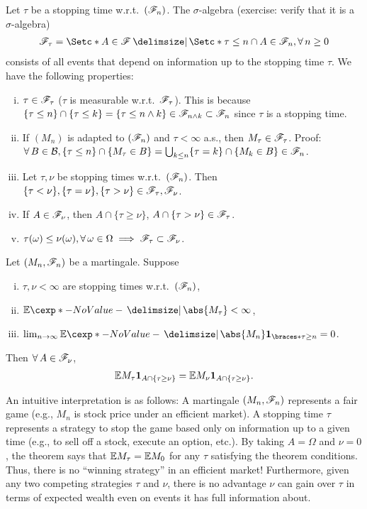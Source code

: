 \documentclass[12pt]{article}
\begin{document}
Let $\tau$ be a stopping time w.r.t.\ $(\mathscr{F}_n)$. The $\sigma$-algebra (exercise: verify that it is a $\sigma$-algebra)
\begin{align*}
\scF_\tau = \set*{A \in \scF\given \set*{\tau \leq n} \cap A \in \scF_n, \forall n \geq 0}
\end{align*}
consists of all events that depend on information up to the stopping time $\tau$. We have the following properties:
\begin{enumerate}[(i)]
\item $\tau \in \mathscr{F}_\tau$ ($\tau$ is measurable w.r.t.\ $\mathscr{F}_\tau$). This is because $\{\tau \leq n\} \cap \{\tau \leq k\} = \{\tau \leq n \wedge k\} \in \mathscr{F}_{n \wedge k} \subset \mathscr{F}_n$ since $\tau$ is a stopping time.
\item If $(M_n)$ is adapted to $(\mathscr{F}_n)$ and $\tau<\infty$ a.s., then $M_\tau \in \mathscr{F}_\tau$.
Proof: $\forall B \in \calB, \{\tau \leq n\} \cap \{M_\tau \in B\} = \bigcup_{k \leq n} \{\tau =k\} \cap \{M_k \in B\} \in \scF_n$.
\item Let $\tau, \nu$ be stopping times w.r.t.\ $(\mathscr{F}_n)$. Then $\{\tau < \nu\}, \{\tau = \nu\}, \{\tau > \nu\} \in \mathscr{F}_\tau, \mathscr{F}_\nu$.
\item If $A \in \mathscr{F}_\nu$, then $A \cap \{\tau \geq \nu\}$,  $A \cap \{\tau > \nu\} \in \mathscr{F}_\tau$.
\item $\tau(\omega) \leq \nu(\omega), \forall \omega \in \Omega \implies \scF_\tau \subset \scF_\nu$.
\end{enumerate}
%
\begin{Theorem} \label{wk13:thm:optional_stopping}
Let $(M_n, \mathscr{F}_n)$ be a martingale. Suppose
\begin{enumerate}[(i)]
\item $\tau, \nu < \infty$ are stopping times w.r.t.\ $(\mathscr{F}_n)$,
\item $\E \abs{M_\tau} < \infty$,
\item $\lim_{n \to \infty} \E \abs{M_n} \indicator{\tau \geq n} = 0$.
\end{enumerate}
Then $\forall A \in \scF_\nu$, 
\begin{align*}
\E M_\tau \indicatore{A \cap \{\tau \geq \nu\}} = \E M_\nu \indicatore{A \cap \{\tau \geq \nu\}}.
\end{align*}
\end{Theorem}
An intuitive interpretation is as follows: A martingale $(M_n,\mathscr{F}_n)$ represents a fair game (e.g., $M_n$ is stock price under an efficient market). A stopping time $\tau$ represents a strategy to stop the game based only on information up to a given time (e.g., to sell off a stock, execute an option, etc.). By taking $A=\Omega$ and $\nu=0$, the theorem says that $\E M_\tau = \E M_0$ for any $\tau$ satisfying the theorem conditions. Thus, there is no ``winning strategy'' in an efficient market! Furthermore, given any two competing strategies $\tau$ and $\nu$, there is no advantage $\nu$ can gain over $\tau$ in terms of expected wealth even on events it has full information about. 
\end{document}
